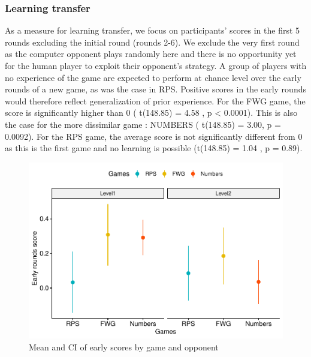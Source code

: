\documentclass[man,floatsintext]{apa6}
\begin{document}
\hypertarget{learning-transfer}{%
\subsubsection{Learning transfer}\label{learning-transfer}}

As a measure for learning transfer, we focus on participants' scores in the first 5 rounds excluding the initial round (rounds 2-6). We exclude the very first round as the computer opponent plays randomly here and there is no opportunity yet for the human player to exploit their opponent's strategy. A group of players with no experience of the game are expected to perform at chance level over the early rounds of a new game, as was the case in RPS. Positive scores in the early rounds would therefore reflect generalization of prior experience. For the FWG game, the score is significantly higher than 0 ( t(148.85) = 4.58 , p \textless{} 0.0001). This is also the case for the more dissimilar game : NUMBERS ( t(148.85) = 3.00, p = 0.0092). For the RPS game, the average score is not significantly different from 0 as this is the first game and no learning is possible (t(148.85) = 1.04 , p = 0.89).

\begin{figure}

{\centering \includegraphics{draft_report_v3_files/figure-latex/exp1-score-by-opp-1} 

}

\caption{Mean and CI of early scores by game and opponent}\label{fig:exp1-score-by-opp}
\end{figure}
\end{document}
